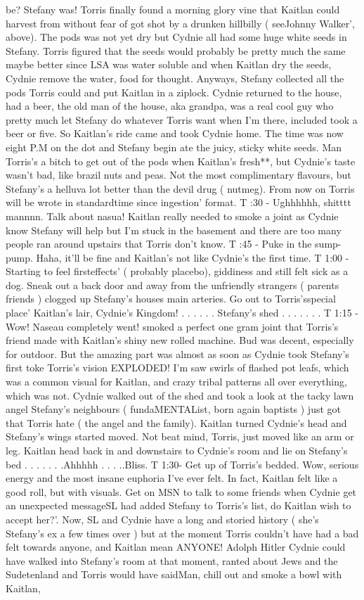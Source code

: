 \documentclass[12pt]{book}
\begin{document}
be? Stefany was! Torris finally found a morning glory vine that Kaitlan could harvest from without fear of got shot by a drunken hillbilly ( seeJohnny Walker', above). The pods was not yet dry but Cydnie all had some huge white seeds in Stefany. Torris figured that the seeds would probably be pretty much the same maybe better since LSA was water soluble and when Kaitlan dry the seeds, Cydnie remove the water, food for thought. Anyways, Stefany collected all the pods Torris could and put Kaitlan in a ziplock. Cydnie returned to the house, had a beer, the old man of the house, aka grandpa, was a real cool guy who pretty much let Stefany do whatever Torris want when I'm there, included took a beer or five. So Kaitlan's ride came and took Cydnie home. The time was now eight P.M on the dot and Stefany begin ate the juicy, sticky white seeds. Man Torris's a bitch to get out of the pods when Kaitlan's fresh**, but Cydnie's taste wasn't bad, like brazil nuts and peas. Not the most complimentary flavours, but Stefany's a helluva lot better than the devil drug ( nutmeg). From now on Torris will be wrote in standardtime since ingestion' format. T :30 - Ughhhhhh, shitttt mannnn. Talk about nasua! Kaitlan really needed to smoke a joint as Cydnie know Stefany will help but I'm stuck in the basement and there are too many people ran around upstairs that Torris don't know. T :45 - Puke in the sump-pump. Haha, it'll be fine and Kaitlan's not like Cydnie's the first time. T 1:00 - Starting to feel firsteffects' ( probably placebo), giddiness and still felt sick as a dog. Sneak out a back door and away from the unfriendly strangers ( parents friends ) clogged up Stefany's houses main arteries. Go out to Torris'sspecial place' Kaitlan's lair, Cydnie's Kingdom!  . . .   . . .  Stefany's shed . . .   . . .  . T 1:15 - Wow! Naseau completely went! smoked a perfect one gram joint that Torris's friend made with Kaitlan's shiny new rolled machine. Bud was decent, especially for outdoor. But the amazing part was almost as soon as Cydnie took Stefany's first toke Torris's vision EXPLODED! I'm saw swirls of flashed pot leafs, which was a common visual for Kaitlan, and crazy tribal patterns all over everything, which was not. Cydnie walked out of the shed and took a look at the tacky lawn angel Stefany's neighbours ( fundaMENTAList, born again baptists ) just got that Torris hate ( the angel and the family). Kaitlan turned Cydnie's head and Stefany's wings started moved. Not beat mind, Torris, just moved like an arm or leg. Kaitlan head back in and downstairs to Cydnie's room and lie on Stefany's bed . . .   . . .  .Ahhhhh . . .  ..Bliss. T 1:30- Get up of Torris's bedded. Wow, serious energy and the most insane euphoria I've ever felt. In fact, Kaitlan felt like a good roll, but with visuals. Get on MSN to talk to some friends when Cydnie get an unexpected messageSL had added Stefany to Torris's list, do Kaitlan wish to accept her?'. Now, SL and Cydnie have a long and storied history ( she's Stefany's ex a few times over ) but at the moment Torris couldn't have had a bad felt towards anyone, and Kaitlan mean ANYONE! Adolph Hitler Cydnie could have walked into Stefany's room at that moment, ranted about Jews and the Sudetenland and Torris would have saidMan, chill out and smoke a bowl with Kaitlan, 
\end{document}
